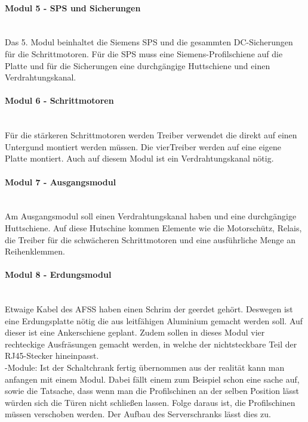     \paragraph{Modul 5 - SPS und Sicherungen}\mbox{}\\
    Das 5. Modul beinhaltet die Siemens SPS und die gesammten DC-Sicherungen für die Schrittmotoren. Für die SPS muss eine Siemens-Profilschiene auf die Platte und für die Sicherungen eine durchgängige Huttschiene und einen Verdrahtungskanal.
    \paragraph{Modul 6 - Schrittmotoren}\mbox{}\\
    Für die stärkeren Schrittmotoren werden Treiber verwendet die direkt auf einen Untergund montiert werden müssen. Die vierTreiber werden auf eine eigene Platte montiert. Auch auf diesem Modul ist ein Verdrahtungskanal nötig.
    \paragraph{Modul 7 - Ausgangsmodul}\mbox{}\\
    Am Ausgangsmodul soll einen Verdrahtungskanal haben und eine durchgängige Huttschiene. Auf diese Hutschine kommen Elemente wie die Motorschütz, Relais, die Treiber für die schwächeren Schrittmotoren und eine ausführliche Menge an Reihenklemmen.\\
    \paragraph{Modul 8 - Erdungsmodul}\mbox{}\\
    Etwaige Kabel des AFSS haben einen Schrim der geerdet gehört. Deswegen ist eine Erdungsplatte nötig die aus leitfähigen Aluminium gemacht werden soll. Auf dieser ist eine Ankerschiene geplant. Zudem sollen in dieses Modul vier rechteckige Ausfräsungen gemacht werden, in welche der nichtsteckbare Teil der RJ45-Stecker hineinpasst.\\

    -Module: Ist der Schaltchrank fertig übernommen aus der realität kann man anfangen mit einem Modul. Dabei fällt einem zum Beispiel schon eine sache auf, sowie die Tatsache, dass wenn man die Profilschinen an der selben Position lässt würden sich die Türen nicht schließen lassen. Folge daraus ist, die Profilschinen müssen verschoben werden. Der Aufbau des Serverschranks lässt dies zu.

